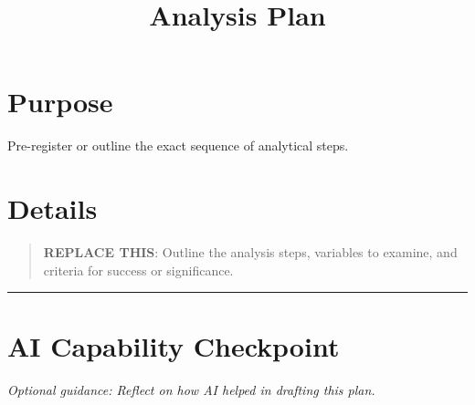 \documentclass[
]{report}
\title{Analysis Plan}
\author{}
\date{}
\renewcommand*\contentsname{Table of contents}
\newcommand\contentsname{Table of contents}
\begin{document}
\maketitle

\renewcommand*\contentsname{Table of contents}
{
\hypersetup{linkcolor=}
\setcounter{tocdepth}{2}
\tableofcontents
}

\chapter{Purpose}\label{purpose}

Pre-register or outline the exact sequence of analytical steps.

\chapter{Details}\label{details}

\begin{quote}
\textbf{REPLACE THIS}: Outline the analysis steps, variables to examine,
and criteria for success or significance.
\end{quote}

\begin{center}\rule{0.5\linewidth}{0.5pt}\end{center}

\chapter{AI Capability Checkpoint}\label{ai-capability-checkpoint}

\emph{Optional guidance: Reflect on how AI helped in drafting this
plan.}
\end{document}
